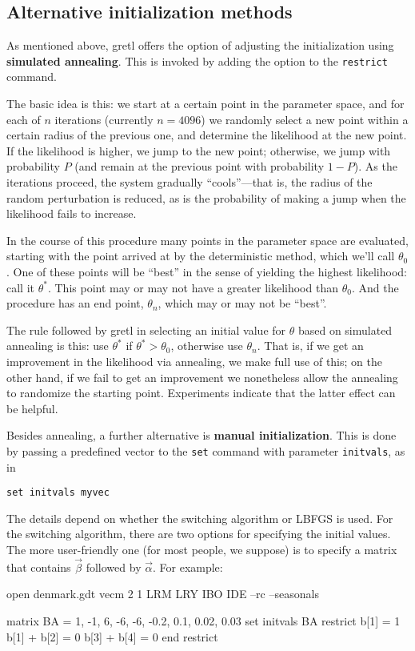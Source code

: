 \subsection{Alternative initialization methods}
\label{sec:vecm-alt-init}

As mentioned above, gretl offers the option of adjusting the
initialization using \textbf{simulated annealing}.  This is invoked by
adding the  option to the \texttt{restrict} command.

The basic idea is this: we start at a certain point in the parameter
space, and for each of $n$ iterations (currently $n=4096$) we randomly
select a new point within a certain radius of the
previous one, and determine the likelihood at the new point.  If the
likelihood is higher, we jump to the new point; otherwise, we jump
with probability $P$ (and remain at the previous point with
probability $1-P$).  As the iterations proceed, the system gradually
``cools''---that is, the radius of the random perturbation is
reduced, as is the probability of making a jump when the likelihood
fails to increase.

In the course of this procedure many points in the parameter space are
evaluated, starting with the point arrived at by the deterministic
method, which we'll call $\theta_0$.  One of these points will be
``best'' in the sense of yielding the highest likelihood: call it
$\theta^*$.  This point may or may not have a greater likelihood than
$\theta_0$.  And the procedure has an end point, $\theta_n$, which may
or may not be ``best''.

The rule followed by gretl in selecting an initial value for $\theta$
based on simulated annealing is this: use $\theta^*$ if $\theta^* >
\theta_0$, otherwise use $\theta_n$.  That is, if we get an
improvement in the likelihood via annealing, we make full use of this;
on the other hand, if we fail to get an improvement we nonetheless
allow the annealing to randomize the starting point.  Experiments
indicate that the latter effect can be helpful.

Besides annealing, a further alternative is \textbf{manual
  initialization}.  This is done by passing a predefined vector to the
\texttt{set} command with parameter \texttt{initvals}, as in
%
\begin{verbatim}
set initvals myvec
\end{verbatim}

The details depend on whether the switching algorithm or LBFGS is
used.  For the switching algorithm, there are two options for
specifying the initial values.  The more user-friendly one (for most
people, we suppose) is to specify a matrix that contains $\vec{\beta}$
followed by $\vec{\alpha}$. For example:
\begin{code}
open denmark.gdt
vecm 2 1 LRM LRY IBO IDE --rc --seasonals

matrix BA = {1, -1, 6, -6, -6, -0.2, 0.1, 0.02, 0.03}
set initvals BA
restrict
  b[1] = 1
  b[1] + b[2] = 0
  b[3] + b[4] = 0
end restrict
\end{code}

